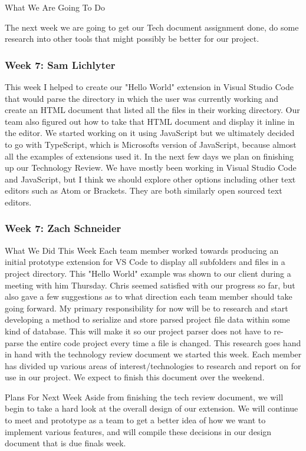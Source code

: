 What We Are Going To Do

The next week we are going to get our Tech document assignment done, do some research into other tools that might possibly be better for our project.

\subsubsection{Week 7: Sam Lichlyter}

This week I helped to create our "Hello World" extension in Visual Studio Code that would parse the directory in which the user was currently working and create an HTML document that listed all the files in their working directory. Our team also figured out how to take that HTML document and display it inline in the editor. We started working on it using JavaScript but we ultimately decided to go with TypeScript, which is Microsofts version of JavaScript, because almost all the examples of extensions used it. In the next few days we plan on finishing up our Technology Review. We have mostly been working in Visual Studio Code and JavaScript, but I think we should explore other options including other text editors such as Atom or Brackets. They are both similarly open sourced text editors.

\subsubsection{Week 7: Zach Schneider}

What We Did This Week
Each team member worked towards producing an initial prototype extension for VS Code to display all subfolders and files in a project directory. This "Hello World" example was shown to our client during a meeting with him Thursday. Chris seemed satisfied with our progress so far, but also gave a few suggestions as to what direction each team member should take going forward. My primary responsibility for now will be to research and start developing a method to serialize and store parsed project file data within some kind of database. This will make it so our project parser does not have to re-parse the entire code project every time a file is changed. This research goes hand in hand with the technology review document we started this week. Each member has divided up various areas of interest/technologies to research and report on for use in our project. We expect to finish this document over the weekend. 

Plans For Next Week
Aside from finishing the tech review document, we will begin to take a hard look at the overall design of our extension. We will continue to meet and prototype as a team to get a better idea of how we want to implement various features, and will compile these decisions in our design document that is due finals week.


